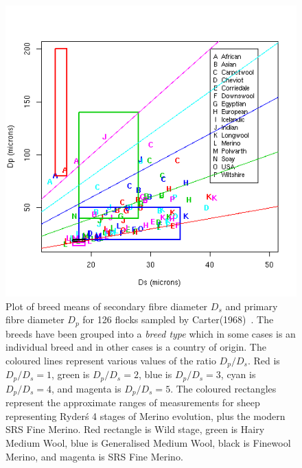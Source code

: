 %

\begin{figure}[!h]
  \centering
   \includegraphics[width=1.0\textwidth]{dsdpalltypea.png}
  \caption{Plot of breed means of secondary fibre diameter $D_{s}$ and primary fibre diameter $D_{p}$ for 126 flocks sampled by Carter(1968)~\cite{cart:68}. The breeds have been grouped into a {\em breed type} which in some cases is an individual breed and in other cases is a country of origin. The coloured lines represent various values of the ratio $D_{p}/D_{s}$. Red is $D_{p}/D_{s}=1$, green is $D_{p}/D_{s}=2$, blue is $D_{p}/D_{s}=3$, cyan is $D_{p}/D_{s}=4$, and magenta is $D_{p}/D_{s}=5$. The coloured rectangles represent the approximate ranges of measurements for sheep representing Ryder\'s 4 stages of Merino evolution, plus the modern SRS Fine Merino. Red rectangle is Wild stage, green is Hairy Medium Wool, blue is Generalised Medium Wool, black is Finewool Merino, and magenta is SRS Fine Merino. }
  \label{fig:dsdptypea}
\end{figure}

%

